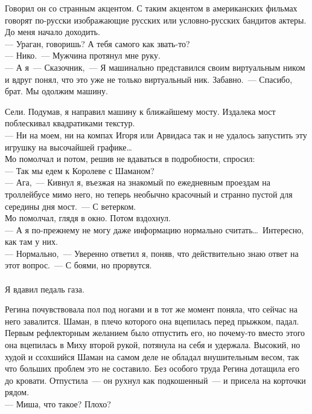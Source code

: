 Говорил он со странным акцентом. С таким акцентом в американских фильмах 
говорят по-русски изображающие русских или условно-русских бандитов актеры. До меня 
начало доходить.\\
--- Ураган, говоришь? А тебя самого как звать-то?\\
--- Нико.~--- Мужчина протянул мне руку.\\
--- А я~--- Сказочник,~--- Я машинально представился своим виртуальным ником и 
вдруг понял, что это уже не только виртуальный ник. Забавно.~--- Спасибо, брат. Мы 
одолжим машину.

Сели. Подумав, я направил машину к ближайшему мосту. Издалека мост поблескивал 
квадратиками текстур.\\
--- Ни на моем, ни на компах Игоря или Арвидаса так и не удалось запустить эту 
игрушку на высочайшей графике\ldots\\
Мо помолчал и потом, решив не вдаваться в подробности, спросил:\\
--- Так мы едем к Королеве с Шаманом?\\
--- Ага,~--- Кивнул я, въезжая на знакомый по ежедневным проездам на троллейбусе 
мимо него, но теперь необычно красочный и странно пустой для середины 
дня мост.~--- С ветерком.\\
Мо помолчал, глядя в окно. Потом вздохнул.\\
--- А я по-прежнему не могу даже информацию нормально считать\ldots\ Интересно, 
как там у них.\\
--- Нормально,~--- Уверенно ответил я, поняв, что действительно знаю ответ на 
этот вопрос.~--- С боями, но прорвутся.\\
\\
Я вдавил педаль газа.

\newpage

Регина почувствовала пол под ногами и в тот же момент поняла, что сейчас на 
него завалится. Шаман, в плечо которого она вцепилась перед прыжком, падал. Первым 
рефлекторным желанием было отпустить его, но почему-то вместо этого она 
вцепилась в Миху второй рукой, потянула на себя и удержала. Высокий, но худой и 
ссохшийся Шаман на самом деле не обладал внушительным весом, так что больших 
проблем это не составило. Без особого труда Регина дотащила его до кровати. 
Отпустила~--- он рухнул как подкошенный~--- и присела на корточки рядом.\\
--- Миша, что такое? Плохо?

